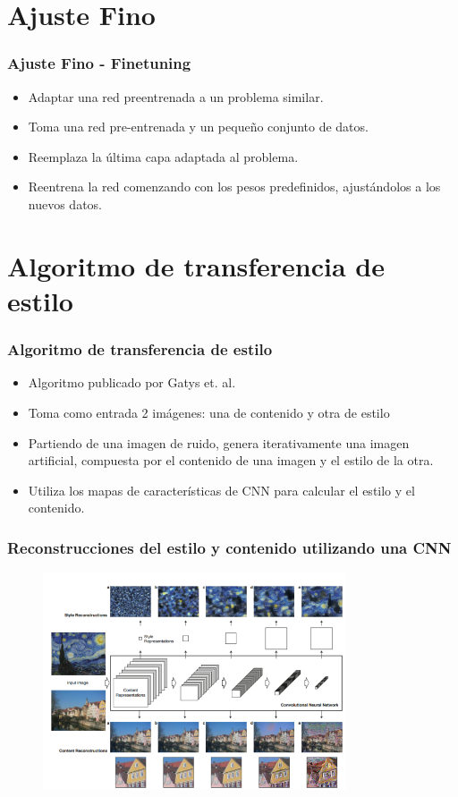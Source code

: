\documentclass[10pt,center]{beamer}
\begin{document}
\section{Ajuste Fino}
\begin{frame}
  \frametitle{Ajuste Fino - Finetuning}
    \begin{itemize}
     \item Adaptar una red preentrenada a un problema similar.
     \item Toma una red pre-entrenada y un pequeño conjunto de datos.
     \item Reemplaza la última capa adaptada al problema.
     \item Reentrena la red comenzando con los pesos predefinidos, ajustándolos a los nuevos datos.
    \end{itemize}
\end{frame}


\section{Algoritmo de transferencia de estilo}
\begin{frame}
 \frametitle{Algoritmo de transferencia de estilo}
 \begin{itemize}
    \item Algoritmo publicado por Gatys et. al.
    \item Toma como entrada 2 imágenes: una de contenido y otra de estilo
    \item Partiendo de una imagen de ruido, genera iterativamente una imagen artificial, compuesta por el contenido de una imagen y el estilo de la otra.
    \item Utiliza los mapas de características de CNN para calcular el estilo y el contenido.
 \end{itemize}
\end{frame}

\begin{frame}
  \frametitle{Reconstrucciones del estilo y contenido utilizando una CNN}
   \begin{figure}[h]
    \begin{center}
     \includegraphics[width=0.8\textwidth]{./img/gatys_1.png}
    \end{center}
  \end{figure} 
\end{frame}
\end{document}

